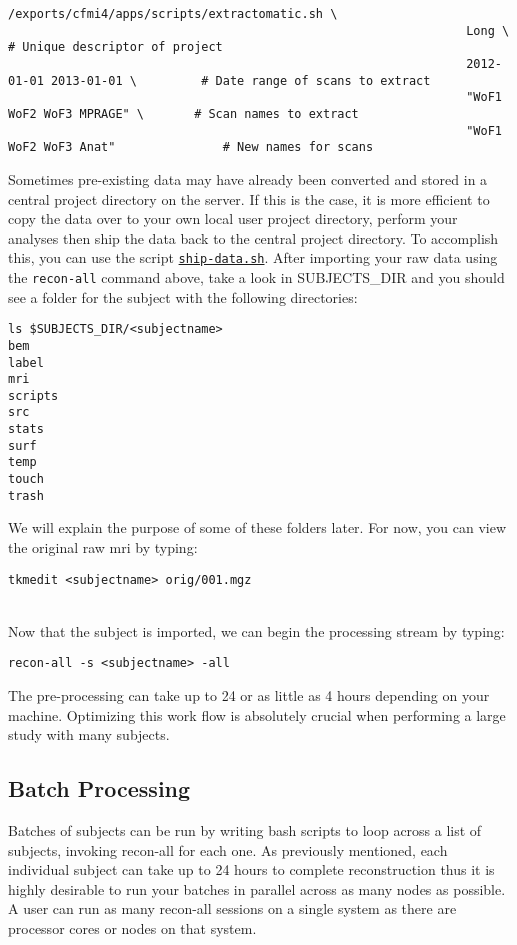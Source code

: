 \documentclass[paper=a4, fontsize=11pt]{scrartcl} %
\numberwithin{equation}{section} %
\numberwithin{figure}{section} %
\numberwithin{table}{section} %
\begin{document}
\begin{lstlisting}
/exports/cfmi4/apps/scripts/extractomatic.sh \
																Long \											# Unique descriptor of project
																2012-01-01 2013-01-01 \			# Date range of scans to extract
																"WoF1 WoF2 WoF3 MPRAGE" \		# Scan names to extract
																"WoF1 WoF2 WoF3 Anat"				# New names for scans
\end{lstlisting}
Sometimes pre-existing data may have already been converted and stored in a central project directory on the server.  If this is the case, it is more efficient to copy the data over to your own local user project directory, perform your analyses then ship the data back to the central project directory.  To accomplish this, you can use the script \href{https://www.dropbox.com/s/urbov04xu7qg31b/ship-data.sh?dl=0}{\texttt{ship-data.sh}}.
\newpage
After importing your raw data using the \texttt{recon-all} command above, take a look in SUBJECTS\_DIR and you should see a folder for the subject with the following directories:
\begin{lstlisting}[frame=single]
ls $SUBJECTS_DIR/<subjectname>
bem
label
mri
scripts
src
stats
surf
temp
touch
trash
\end{lstlisting}
We will explain the purpose of some of these folders later.  For now, you can view the original raw mri by typing:
\begin{lstlisting}[frame=single]
tkmedit <subjectname> orig/001.mgz
\end{lstlisting}
~\\
Now that the subject is imported, we can begin the processing stream by typing:
\begin{lstlisting}[frame=single]
recon-all -s <subjectname> -all
\end{lstlisting}

The pre-processing can take up to 24 or as little as 4 hours depending on your machine.  Optimizing this work flow is absolutely crucial when performing a large study with many subjects.
\subsection{Batch Processing}
Batches of subjects can be run by writing bash scripts to loop across a list of subjects, invoking recon-all for each one.  As previously mentioned, each individual subject can take up to 24 hours to complete reconstruction thus it is highly desirable to run your batches in parallel across as many nodes as possible.  A user can run as many recon-all sessions on a single system as there are processor cores or nodes on that system.  
\end{document}
